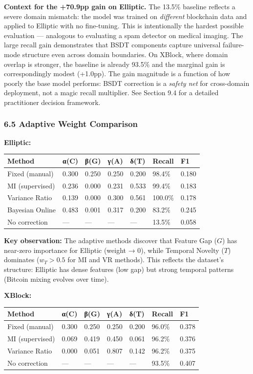 \documentclass[
  11pt,
]{article}
\newcounter{none} %
\begin{document}
\textbf{Context for the +70.9pp gain on Elliptic.} The 13.5\% baseline
reflects a severe domain mismatch: the model was trained on
\emph{different} blockchain data and applied to Elliptic with no
fine-tuning. This is intentionally the hardest possible evaluation —
analogous to evaluating a spam detector on medical imaging. The large
recall gain demonstrates that BSDT components capture universal
failure-mode structure even across domain boundaries. On XBlock, where
domain overlap is stronger, the baseline is already 93.5\% and the
marginal gain is correspondingly modest (+1.0pp). The gain magnitude is
a function of how poorly the base model performs: BSDT correction is a
\emph{safety net} for cross-domain deployment, not a magic recall
multiplier. See Section 9.4 for a detailed practitioner decision
framework.

\subsubsection{6.5 Adaptive Weight
Comparison}\label{adaptive-weight-comparison}

\textbf{Elliptic:}

{\def\LTcaptype{none} %
\begin{longtable}[]{@{}lllllll@{}}
\toprule\noalign{}
Method & α(C) & β(G) & γ(A) & δ(T) & Recall & F1 \\
\midrule\noalign{}
\endhead
\bottomrule\noalign{}
\endlastfoot
Fixed (manual) & 0.300 & 0.250 & 0.250 & 0.200 & 98.4\% & 0.180 \\
MI (supervised) & 0.236 & 0.000 & 0.231 & 0.533 & 99.4\% & 0.183 \\
Variance Ratio & 0.139 & 0.000 & 0.300 & 0.561 & 100.0\% & 0.178 \\
Bayesian Online & 0.483 & 0.001 & 0.317 & 0.200 & 83.2\% & 0.245 \\
No correction & — & — & — & — & 13.5\% & 0.058 \\
\end{longtable}
}

\textbf{Key observation:} The adaptive methods discover that Feature Gap
(\(G\)) has near-zero importance for Elliptic (weight → 0), while
Temporal Novelty (\(T\)) dominates (\(w_T > 0.5\) for MI and VR
methods). This reflects the dataset’s structure: Elliptic has dense
features (low gap) but strong temporal patterns (Bitcoin mixing evolves
over time).

\textbf{XBlock:}

{\def\LTcaptype{none} %
\begin{longtable}[]{@{}lllllll@{}}
\toprule\noalign{}
Method & α(C) & β(G) & γ(A) & δ(T) & Recall & F1 \\
\midrule\noalign{}
\endhead
\bottomrule\noalign{}
\endlastfoot
Fixed (manual) & 0.300 & 0.250 & 0.250 & 0.200 & 96.0\% & 0.378 \\
MI (supervised) & 0.069 & 0.419 & 0.450 & 0.061 & 96.2\% & 0.376 \\
Variance Ratio & 0.000 & 0.051 & 0.807 & 0.142 & 96.2\% & 0.375 \\
No correction & — & — & — & — & 93.5\% & 0.407 \\
\end{longtable}
}
\end{document}
